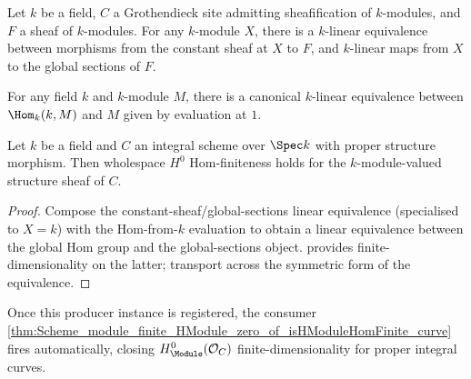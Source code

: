\begin{theorem}
  \label{def:Scheme_constantSheafGammaHom_linearEquiv}
  Let \(k\) be a field, \(C\) a Grothendieck site admitting sheafification of \(k\)-modules, and \(F\) a sheaf of \(k\)-modules. For any \(k\)-module \(X\), there is a \(k\)-linear equivalence between morphisms from the constant sheaf at \(X\) to \(F\), and \(k\)-linear maps from \(X\) to the global sections of \(F\).
\end{theorem}

\begin{theorem}
  \label{def:Scheme_homFromOne_linearEquiv}
  For any field \(k\) and \(k\)-module \(M\), there is a canonical \(k\)-linear equivalence between \(\Hom_k(k, M)\) and \(M\) given by evaluation at \(1\).
\end{theorem}

\begin{theorem}
  \label{inst:Scheme_instIsHModuleHomFinite_toModuleKSheaf}
  Let \(k\) be a field and \(C\) an integral scheme over \(\Spec k\) with proper structure morphism. Then wholespace \(H^0\) Hom-finiteness holds for the \(k\)-module-valued structure sheaf of \(C\).
\end{theorem}

\begin{proof}
  
  \leanok
  Compose the constant-sheaf/global-sections linear equivalence (specialised to \(X = k\)) with the Hom-from-\(k\) evaluation to obtain a linear equivalence between the global Hom group and the global-sections object.  provides finite-dimensionality on the latter; transport across the symmetric form of the equivalence.
\end{proof}

\begin{remark}
  Once this producer instance is registered, the consumer \cref{thm:Scheme_module_finite_HModule_zero_of_isHModuleHomFinite_curve} fires automatically, closing \(H^0_{\Module}(\mathcal O_C)\) finite-dimensionality for proper integral curves.
\end{remark}

